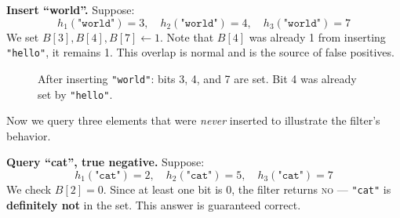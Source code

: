 \textbf{Insert ``world''.} Suppose:
\[
  h_1(\texttt{"world"}) = 3, \quad 
  h_2(\texttt{"world"}) = 4, \quad 
  h_3(\texttt{"world"}) = 7
\]
We set $B[3], B[4], B[7] \leftarrow 1$. Note that $B[4]$ was already 1 
from inserting \texttt{"hello"}, it remains 1. This overlap is normal 
and is the source of false positives.

\begin{figure}[H]
  \centering
  \caption{After inserting \texttt{"world"}: bits 3, 4, and 7 are set. 
           Bit 4 was already set by \texttt{"hello"}.}
  \label{fig:bloom-insert-world}
\end{figure}

Now we query three elements that were \emph{never} inserted to illustrate 
the filter's behavior.

\textbf{Query ``cat'', true negative.} Suppose:
\[
  h_1(\texttt{"cat"}) = 2, \quad 
  h_2(\texttt{"cat"}) = 5, \quad 
  h_3(\texttt{"cat"}) = 7
\]
We check $B[2] = 0$. Since at least one bit is 0, the filter returns 
\textsc{no} --- \texttt{"cat"} is \textbf{definitely not} in the set. 
This answer is guaranteed correct.

